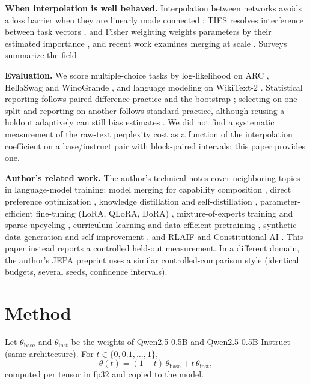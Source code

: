 \documentclass[conference]{IEEEtran}
\begin{document}
\textbf{When interpolation is well behaved.} Interpolation between networks avoids a loss barrier when they are linearly mode connected \cite{frankle2019lmc}; TIES resolves interference between task vectors \cite{yadav2023ties}, and Fisher weighting weights parameters by their estimated importance \cite{matena2021fisher}, and recent work examines merging at scale \cite{yadav2024scale}. Surveys summarize the field \cite{yang2024mergingsurvey}.

\textbf{Evaluation.} We score multiple-choice tasks by log-likelihood \cite{gao2021lmeval} on ARC \cite{clark2018arc}, HellaSwag \cite{zellers2019hellaswag} and WinoGrande \cite{sakaguchi2019winogrande}, and language modeling on WikiText-2 \cite{merity2016pointer}. Statistical reporting follows paired-difference practice \cite{miller2024errorbars} and the bootstrap \cite{efron1979bootstrap}; selecting on one split and reporting on another follows standard practice, although reusing a holdout adaptively can still bias estimates \cite{dwork2014adaptive}. We did not find a systematic measurement of the raw-text perplexity cost as a function of the interpolation coefficient on a base/instruct pair with block-paired intervals; this paper provides one.

\textbf{Author's related work.} The author's technical notes cover neighboring topics in language-model training: model merging for capability composition \cite{santos2026modelmergingfo}, direct preference optimization \cite{santos2026directpreferen}, knowledge distillation and self-distillation \cite{santos2026knowledgedisti}, parameter-efficient fine-tuning (LoRA, QLoRA, DoRA) \cite{santos2026parametereffic}, mixture-of-experts training and sparse upcycling \cite{santos2026mixtureofexper}, curriculum learning and data-efficient pretraining \cite{santos2026curriculumlear}, synthetic data generation and self-improvement \cite{santos2026syntheticdatag}, and RLAIF and Constitutional AI \cite{santos2026rlaifandconsti}. This paper instead reports a controlled held-out measurement. In a different domain, the author's JEPA preprint \cite{santos2026collapseresist} uses a similar controlled-comparison style (identical budgets, several seeds, confidence intervals).

\section{Method}
Let $\theta_{\text{base}}$ and $\theta_{\text{inst}}$ be the weights of Qwen2.5-0.5B and Qwen2.5-0.5B-Instruct (same architecture). For $t\in\{0,0.1,\dots,1\}$,
\begin{equation}
\theta(t)=(1-t)\,\theta_{\text{base}}+t\,\theta_{\text{inst}},
\end{equation}
computed per tensor in fp32 and copied to the model.
\end{document}
